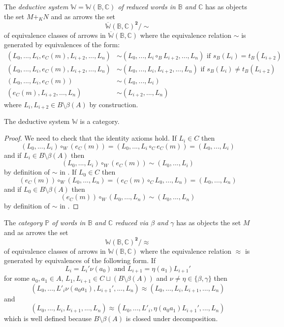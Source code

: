 \documentclass{article}
\begin{document}
\begin{definition}\label{reduced-words-ordinary}
	The \emph{deductive system $\mathbb{W}=\mathbb{W}(\mathbb{B},\mathbb{C})$ of  reduced words in $\mathbb{B}$ and $\mathbb{C}$} has as objects the set $M+_K N$ and as arrows the set
	$$\overline{\mathbb{W}}(\mathbb{B},\mathbb{C})^{\mathbf{2}}/\sim$$
	of equivalence classes of arrows in $\overline{\mathbb{W}}(\mathbb{B},\mathbb{C})$ where the equivalence relation $\sim$ is generated by equivalences of the form:
	\begin{align*}
		(L_0,...,L_i,e_C(m),L_{i+2},...,L_n)&\sim (L_0,...,L_i\circ_B L_{i+2},...,L_n)\text{ if }s_B(L_i)=t_B(L_{i+2})\\
		(L_0,...,L_i,e_C(m),L_{i+2},...,L_n)&\sim (L_0,...,L_i, L_{i+2},...,L_n)\text{ if }s_B(L_i)\neq t_B(L_{i+2})\\
		(L_0,...,L_i,e_C(m))&\sim (L_0,...,L_i)\\
		(e_C(m),L_{i+2},...,L_n)&\sim (L_{i+2},...,L_n)
	\end{align*}
	where $L_i, L_{i+2}\in B\setminus \beta(A)$ by construction.
\end{definition}

\begin{lemma}
	The deductive system $\mathbb{W}$ is a category.
	\begin{proof}
		We need to check that the identity axioms hold.
		If $L_i\in C$ then
		$$(L_0,...,L_i)\circ_W(e_C(m))=(L_0,...,L_i\circ_C e_C(m))=(L_0,...,L_i)$$
		and if $L_i\in B\setminus \beta(A)$ then
		$$(L_0,...,L_i)\circ_W(e_C(m))\sim(L_0,...,L_i)$$
		by definition of $\sim$ in .
		If $L_0\in C$ then
		$$(e_C(m))\circ_W(L_0,...,L_n) = (e_C(m)\circ_C L_0,...,L_n)=(L_0,...,L_n)$$
		and if $L_0\in B\setminus \beta(A)$ then
		$$(e_C(m))\circ_W(L_0,...,L_n)\sim (L_0,...,L_n)$$
		by definition of $\sim$ in .
	\end{proof}
\end{lemma}

\begin{definition}\label{category-of-reduced-words}
	The \emph{category $\mathbb{P}$ of words in $\mathbb{B}$ and $\mathbb{C}$ reduced via $\beta$ and $\gamma$} has as objects the set $M$ and as arrows the set
	$${\mathbb{W}}(\mathbb{B},\mathbb{C})^{\mathbf{2}}/\approx$$
	of equivalence classes of arrows in ${\mathbb{W}}(\mathbb{B},\mathbb{C})$ where the equivalence relation $\approx$ is generated by equivalences of the following form.
	If
	$$L_i=L_i'\nu(a_0)\text{ and }L_{i+1}=\eta(a_1)L_{i+1}'$$
	for some $a_0,a_1\in A$, $L_1,L_{i+1}\in C\sqcup (B\setminus \beta(A))$ and $\nu\neq \eta\in \{\beta,\gamma\}$ then
	$$(L_0,...,L'_i\nu(a_0 a_1),L_{i+1}',...,L_n)\approx (L_0,...,L_i,L_{i+1},...,L_n)$$
	and
	$$(L_0,...,L_i,L_{i+1},...,L_n)\approx (L_0,...,L'_i,\eta(a_0 a_1)L_{i+1}',...,L_n)$$
	which is well defined because $B\setminus \beta(A)$ is closed under decomposition.
\end{definition}
\end{document}
